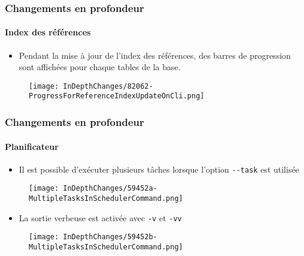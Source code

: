 
\begin{frame}[fragile]
	\frametitle{Changements en profondeur}
	\framesubtitle{Index des références}

	\lstset{basicstyle=\tiny\ttfamily}

	\begin{itemize}
		\item Pendant la mise à jour de l'index des références, des barres de progression sont
			affichées pour chaque tables de la base.
	\end{itemize}

	\begin{figure}
		\texttt{[image: InDepthChanges/82062-ProgressForReferenceIndexUpdateOnCli.png]}
	\end{figure}

\end{frame}


\begin{frame}[fragile]
	\frametitle{Changements en profondeur}
	\framesubtitle{Planificateur}

	\lstset{basicstyle=\tiny\ttfamily}

	\begin{itemize}
		\item Il est possible d'exécuter plusieurs tâches lorsque l'option \texttt{-}\texttt{-}\texttt{task} est utilisée
	\end{itemize}

	\begin{figure}
		\texttt{[image: InDepthChanges/59452a-MultipleTasksInSchedulerCommand.png]}
	\end{figure}

	\begin{itemize}
		\item La sortie verbeuse est activée avec \texttt{-}\texttt{v} et \texttt{-}\texttt{vv}
	\end{itemize}

	\begin{figure}
		\texttt{[image: InDepthChanges/59452b-MultipleTasksInSchedulerCommand.png]}
	\end{figure}

\end{frame}

